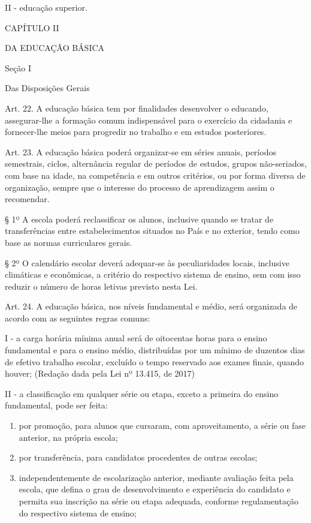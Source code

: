 \documentclass[
]{book}
\begin{document}
II - educação superior.

CAPÍTULO II

DA EDUCAÇÃO BÁSICA

Seção I

Das Disposições Gerais

Art. 22. A educação básica tem por finalidades desenvolver o educando, assegurar-lhe a formação comum indispensável para o exercício da cidadania e fornecer-lhe meios para progredir no trabalho e em estudos posteriores.

Art. 23. A educação básica poderá organizar-se em séries anuais, períodos semestrais, ciclos, alternância regular de períodos de estudos, grupos não-seriados, com base na idade, na competência e em outros critérios, ou por forma diversa de organização, sempre que o interesse do processo de aprendizagem assim o recomendar.

§ 1º A escola poderá reclassificar os alunos, inclusive quando se tratar de transferências entre estabelecimentos situados no País e no exterior, tendo como base as normas curriculares gerais.

§ 2º O calendário escolar deverá adequar-se às peculiaridades locais, inclusive climáticas e econômicas, a critério do respectivo sistema de ensino, sem com isso reduzir o número de horas letivas previsto nesta Lei.

Art. 24. A educação básica, nos níveis fundamental e médio, será organizada de acordo com as seguintes regras comuns:

I - a carga horária mínima anual será de oitocentas horas para o ensino fundamental e para o ensino médio, distribuídas por um mínimo de duzentos dias de efetivo trabalho escolar, excluído o tempo reservado aos exames finais, quando houver; (Redação dada pela Lei nº 13.415, de 2017)

II - a classificação em qualquer série ou etapa, exceto a primeira do ensino fundamental, pode ser feita:

\begin{enumerate}
\def\labelenumi{\alph{enumi})}
\item
  por promoção, para alunos que cursaram, com aproveitamento, a série ou fase anterior, na própria escola;
\item
  por transferência, para candidatos procedentes de outras escolas;
\item
  independentemente de escolarização anterior, mediante avaliação feita pela escola, que defina o grau de desenvolvimento e experiência do candidato e permita sua inscrição na série ou etapa adequada, conforme regulamentação do respectivo sistema de ensino;
\end{enumerate}
\end{document}
